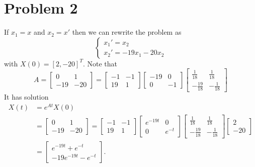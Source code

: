 \documentclass{article}
\begin{document}
\section*{Problem 2}
If $x_1 = x$ and $x_2 = x'$ then we can rewrite the problem as
\[
	\begin{cases}
		x_1' = x_2 \\
		x_2' = -19x_1 -20x_2
	\end{cases}
\]
with $X(0) = [2,-20]^T$.
Note that 
\[
	A =
	\begin{bmatrix}
		0 & 1 \\
		-19 & -20
	\end{bmatrix} = 
	\begin{bmatrix}
		-1 & -1 \\
		19 & 1
	\end{bmatrix}
	\begin{bmatrix}
		-19 & 0 \\
		0 & -1
	\end{bmatrix}
	\begin{bmatrix}
		\frac{1}{18} & \frac{1}{18} \\
		-\frac{19}{18} & -\frac{1}{18}
	\end{bmatrix}
\]
It has solution 
\begin{align*}
	X(t) &= e^{At}X(0) \\
	&= \begin{bmatrix}
		0 & 1 \\
		-19 & -20
	\end{bmatrix} = 
	\begin{bmatrix}
		-1 & -1 \\
		19 & 1
	\end{bmatrix}
	\begin{bmatrix}
		e^{-19t} & 0 \\
		0 & e^{-t}
	\end{bmatrix}
	\begin{bmatrix}
		\frac{1}{18} & \frac{1}{18} \\
		-\frac{19}{18} & -\frac{1}{18}
	\end{bmatrix}
	\begin{bmatrix}
		2 \\ -20
	\end{bmatrix} \\
	&= 
	\begin{bmatrix}
		e^{-19t} + e^{-t} \\
		-19e^{-19t} - e^{-t}
	\end{bmatrix}.
\end{align*}
\end{document}
